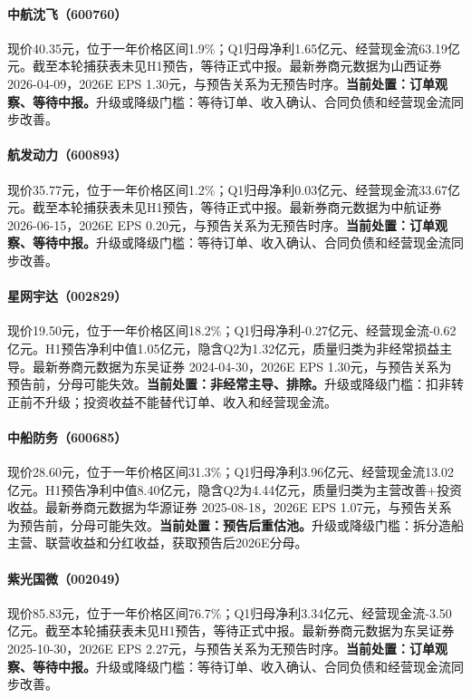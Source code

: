 \paragraph{中航沈飞（600760）}
现价40.35元，位于一年价格区间1.9\%；Q1归母净利1.65亿元、经营现金流63.19亿元。截至本轮捕获表未见H1预告，等待正式中报。最新券商元数据为山西证券 2026-04-09，2026E EPS 1.30元，与预告关系为无预告时序。\textbf{当前处置：订单观察、等待中报。}升级或降级门槛：等待订单、收入确认、合同负债和经营现金流同步改善。

\paragraph{航发动力（600893）}
现价35.77元，位于一年价格区间1.2\%；Q1归母净利0.03亿元、经营现金流33.67亿元。截至本轮捕获表未见H1预告，等待正式中报。最新券商元数据为中航证券 2026-06-15，2026E EPS 0.20元，与预告关系为无预告时序。\textbf{当前处置：订单观察、等待中报。}升级或降级门槛：等待订单、收入确认、合同负债和经营现金流同步改善。

\paragraph{星网宇达（002829）}
现价19.50元，位于一年价格区间18.2\%；Q1归母净利-0.27亿元、经营现金流-0.62亿元。H1预告净利中值1.05亿元，隐含Q2为1.32亿元，质量归类为非经常损益主导。最新券商元数据为东吴证券 2024-04-30，2026E EPS 1.30元，与预告关系为预告前，分母可能失效。\textbf{当前处置：非经常主导、排除。}升级或降级门槛：扣非转正前不升级；投资收益不能替代订单、收入和经营现金流。

\paragraph{中船防务（600685）}
现价28.60元，位于一年价格区间31.3\%；Q1归母净利3.96亿元、经营现金流13.02亿元。H1预告净利中值8.40亿元，隐含Q2为4.44亿元，质量归类为主营改善+投资收益。最新券商元数据为华源证券 2025-08-18，2026E EPS 1.07元，与预告关系为预告前，分母可能失效。\textbf{当前处置：预告后重估池。}升级或降级门槛：拆分造船主营、联营收益和分红收益，获取预告后2026E分母。

\paragraph{紫光国微（002049）}
现价85.83元，位于一年价格区间76.7\%；Q1归母净利3.34亿元、经营现金流-3.50亿元。截至本轮捕获表未见H1预告，等待正式中报。最新券商元数据为东吴证券 2025-10-30，2026E EPS 2.27元，与预告关系为无预告时序。\textbf{当前处置：订单观察、等待中报。}升级或降级门槛：等待订单、收入确认、合同负债和经营现金流同步改善。

